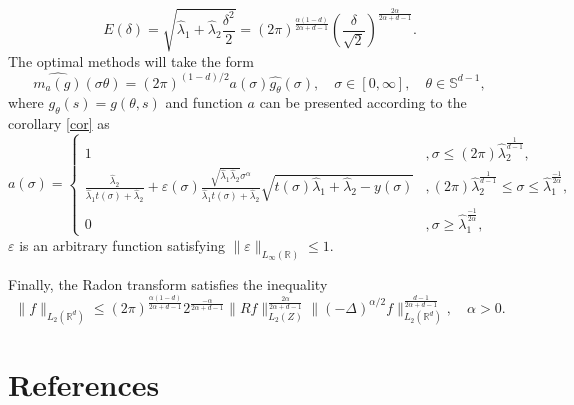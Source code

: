 \documentclass[12pt]{iopart}
\begin{document}
$$
E(\delta)=\sqrt{\widehat\lambda_1+\widehat\lambda_2\frac{\delta^2}{2}}=(2\pi)^{\frac{\alpha(1-d)}{2\alpha+d-1}}\left(\frac{\delta}{\sqrt{2}}\right)^{\frac{2\alpha}{2\alpha+d-1}}.
$$
The optimal methods will take the form 
$$
  \widehat{m_a(g)}(\sigma\theta)=(2\pi)^{(1-d)/2}a(\sigma)\widehat{g_\theta }(\sigma),\quad \sigma\in[0,\infty],\quad \theta\in\mathbb S^{d-1},
$$
where $g_{\theta}(s)=g(\theta,s)$ and function $a$ can be presented according to the corollary \ref{cor} as
$$
a(\sigma)=
  \begin{cases}
    1& ,\sigma\leqslant (2\pi)\widehat\lambda_2^\frac{1}{d-1},\\
    \frac{\widehat\lambda_2}{\widehat\lambda_1t(\sigma)+\widehat\lambda_2}+\varepsilon(\sigma)\frac{\sqrt{\widehat\lambda_1\widehat\lambda_2}\sigma^\alpha}{\widehat\lambda_1t(\sigma)+\widehat\lambda_2}\sqrt{t(\sigma)\widehat\lambda_1+\widehat\lambda_2-y(\sigma)}& ,(2\pi)\widehat\lambda_2^\frac{1}{d-1} \leqslant\sigma\leqslant\widehat\lambda_1^{\frac{-1}{2\alpha}},\\
    0 &,\sigma\geqslant\widehat\lambda_1^{\frac{-1}{2\alpha}},
  \end{cases}
$$
$\varepsilon$ is an arbitrary function satisfying $\|\varepsilon\|_{L_\infty(\mathbb R)}\leqslant 1$.

Finally, the Radon transform satisfies the inequality
$$
\|f\|_{L_2(\mathbb R^d)}\leqslant
(2\pi)^{\frac{\alpha(1-d)}{2\alpha+d-1}}2^{\frac{-\alpha}{2\alpha+d-1}}\|Rf\|_{L_2(Z)}^{\frac{2\alpha}{2\alpha+d-1}}\|(-\Delta)^{\alpha/2}f\|_{L_2(\mathbb
  R^d)}^\frac{d-1}{2\alpha+d-1},\quad \alpha>0.
$$




\section*{References}

%

\end{document}
